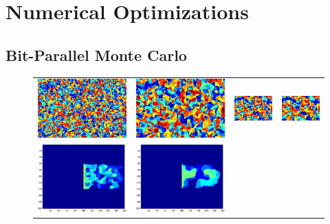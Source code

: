 \section{Numerical Optimizations}

\subsection{Bit-Parallel Monte Carlo}

\begin{figure}
\centering
\begin{tabular}{cccc}
\includegraphics[height=.75in, trim={.7cm 0 .7cm 0},clip]{Parallel_Bits/iso-01}&
\includegraphics[height=.75in, trim={.7cm 0 .7cm 0},clip]{Parallel_Bits/iso-02}&
\includegraphics[height=.75in, trim={.7cm 0 .7cm 0},clip]{Parallel_Bits/iso-03}&
\includegraphics[height=.75in, trim={.7cm 0 .7cm 0},clip]{Parallel_Bits/iso-04}\\
\includegraphics[height=.75in, trim={.7cm .6cm .7cm .6cm}, clip]{Parallel_Bits/par025}&
\includegraphics[height=.75in, trim={.7cm .6cm .7cm .6cm}, clip]{Parallel_Bits/par100}&

\end{tabular}
\end{figure}
